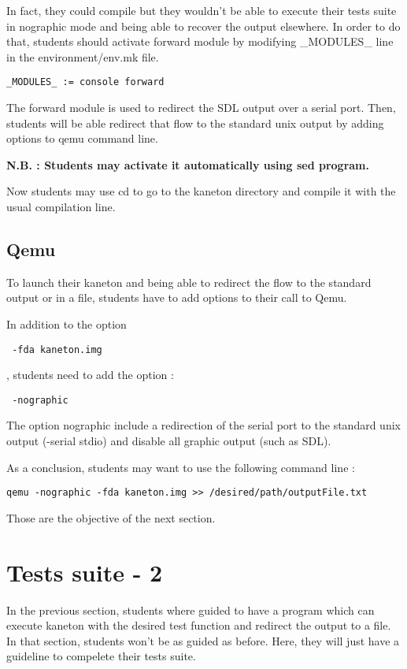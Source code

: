 In fact, they could compile but they wouldn't be able to execute their tests suite in nographic mode and being able to recover the output elsewhere. In order to do that, students should activate forward module by modifying \_MODULES\_ line in the environment/env.mk file.

\begin{verbatim}
_MODULES_ := console forward
\end{verbatim}

The forward module is used to redirect the SDL output over a serial port. Then, students will be able redirect that flow to the standard unix output by adding options to qemu command line.

\textbf{N.B. : Students may activate it automatically using sed program.}

Now students may use cd to go to the kaneton directory and compile it with the usual compilation line.

\subsection{Qemu}
To launch their kaneton and being able to redirect the flow to the standard output or in a file, students have to add options to their call to Qemu.

In addition to  the option
\begin{verbatim} -fda kaneton.img \end{verbatim}
, students need to add the option :
\begin{verbatim} -nographic \end{verbatim}
The option nographic include a redirection of the serial port to the standard unix output (-serial stdio) and disable all graphic output (such as SDL).

As a conclusion, students may want to use the following command line :
\begin{verbatim}
qemu -nographic -fda kaneton.img >> /desired/path/outputFile.txt
\end{verbatim}


Those are the objective of the next section.

\section{Tests suite - 2}
In the previous section, students where guided to have a program which can execute kaneton with the desired test function and redirect the output to a file. In that section, students won't be as guided as before. Here, they will just have a guideline to compelete their tests suite.



